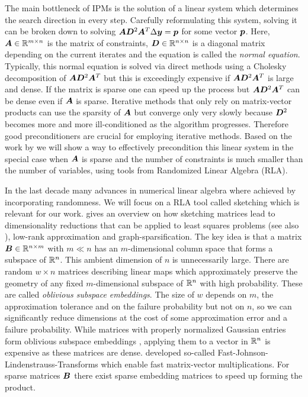 The main bottleneck of IPMs is the solution of a linear system which determines the search direction in every step.
Carefully reformulating this system, solving it can be broken down to solving \(\bm{A} \bm{D}^2 \bm{A}^T \Delta \bm{y} = \bm{p}\) for some vector \(\bm{p}\).
Here, \(\bm{A} \in \mathbb{R}^{m \times n}\) is the matrix of constraints, \(\bm{D} \in \mathbb{R}^{n \times n}\) is a diagonal matrix depending on the current iterates and the equation is called the \emph{normal equation}.
Typically, this normal equation is solved via direct methods using a Cholesky decomposition of \(\bm{A} \bm{D}^2 \bm{A}^T\) \cite[p. 17]{Wright-PrimalDualInteriorPointMethods} but this is exceedingly expensive if \(\bm{A} \bm{D}^2 \bm{A}^T\) is large and dense.
If the matrix is sparse one can speed up the process \cite{NgPeyton-SparseCholesky} but \(\bm{A} \bm{D}^2 \bm{A}^T\) can be dense even if \(\bm{A}\) is sparse.
Iterative methods that only rely on matrix-vector products can use the sparsity of \(\bm{A}\) but converge only very slowly because \(\bm{D}^2\) becomes more and more ill-conditioned as the algorithm progresses.
Therefore good preconditioners are crucial for employing iterative methods.
Based on the work by \textcite{Avron-FasterRandomizedInfeasibleIPMs} we will show a way to effectively precondition this linear system in the special case when \(\bm{A}\) is sparse and the number of constraints is much smaller than the number of variables, using tools from Randomized Linear Algebra (RLA).

In the last decade many advances in numerical linear algebra where achieved by incorporating randomness.
We will focus on a RLA tool called sketching which is relevant for our work.
\textcite{Woodruff-Sketching} gives an overview on how sketching matrices lead to dimensionality reductions that can be applied to least squares problems (see also \cite{Avron-Blendenpik}), low-rank approximation and graph-sparsification.
The key idea is that a matrix \(\bm{B} \in \mathbb{R}^{n \times m}\) with \(m \ll n\) has an \(m\)-dimensional column space that forms a subspace of \(\mathbb{R}^n\).
This ambient dimension of \(n\) is unnecessarily large.
There are random \(w \times n\) matrices describing linear maps which approximately preserve the geometry of any fixed \(m\)-dimensional subspace of \(\mathbb{R}^n\) with high probability.
These are called \emph{oblivious subspace embeddings}.
The size of \(w\) depends on \(m\), the approximation tolerance and on the failure probability but not on \(n\), so we can significantly reduce dimensions at the cost of some approximation error and a failure probability.
While matrices with properly normalized Gaussian entries form oblivious subspace embeddings \cite[Theorem 6]{Woodruff-Sketching}, applying them to a vector in \(\mathbb{R}^n\) is expensive as these matrices are dense.
\textcite{AilonChazelle-FastJohnsonLindenstraussTransform} developed so-called Fast-Johnson-Lindenstrauss-Transforms which enable fast matrix-vector multiplications. For sparse matrices \(\bm{B}\) there exist sparse embedding matrices \cite{Achlioptas-SparseSketching,Cohen-NearlyTightObliviousSubspaceEmbeddings} to speed up forming the product.

